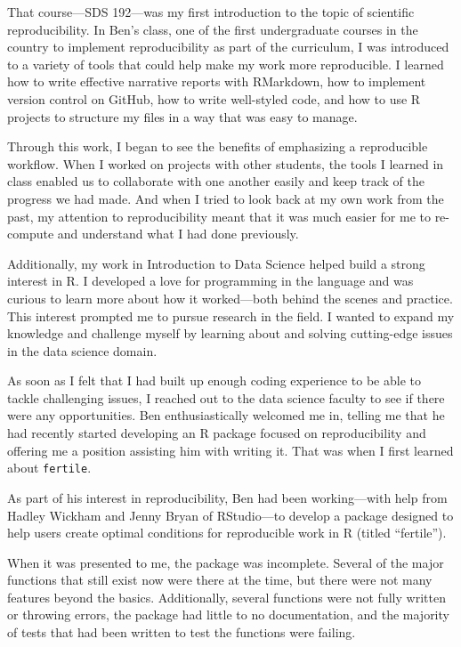 \documentclass[12pt,twoside]{reedthesis}
\begin{document}
That course---SDS 192---was my first introduction to the topic of
scientific reproducibility. In Ben's class, one of the first
undergraduate courses in the country to implement reproducibility as
part of the curriculum, I was introduced to a variety of tools that
could help make my work more reproducible. I learned how to write
effective narrative reports with RMarkdown, how to implement version
control on GitHub, how to write well-styled code, and how to use R
projects to structure my files in a way that was easy to manage.

Through this work, I began to see the benefits of emphasizing a
reproducible workflow. When I worked on projects with other students,
the tools I learned in class enabled us to collaborate with one another
easily and keep track of the progress we had made. And when I tried to
look back at my own work from the past, my attention to reproducibility
meant that it was much easier for me to re-compute and understand what I
had done previously.

Additionally, my work in Introduction to Data Science helped build a
strong interest in R. I developed a love for programming in the language
and was curious to learn more about how it worked---both behind the
scenes and practice. This interest prompted me to pursue research in the
field. I wanted to expand my knowledge and challenge myself by learning
about and solving cutting-edge issues in the data science domain.

As soon as I felt that I had built up enough coding experience to be
able to tackle challenging issues, I reached out to the data science
faculty to see if there were any opportunities. Ben enthusiastically
welcomed me in, telling me that he had recently started developing an R
package focused on reproducibility and offering me a position assisting
him with writing it. That was when I first learned about
\texttt{fertile}.

As part of his interest in reproducibility, Ben had been working---with
help from Hadley Wickham and Jenny Bryan of RStudio---to develop a
package designed to help users create optimal conditions for
reproducible work in R (titled ``fertile'').

When it was presented to me, the package was incomplete. Several of the
major functions that still exist now were there at the time, but there
were not many features beyond the basics. Additionally, several
functions were not fully written or throwing errors, the package had
little to no documentation, and the majority of tests that had been
written to test the functions were failing.
\end{document}

